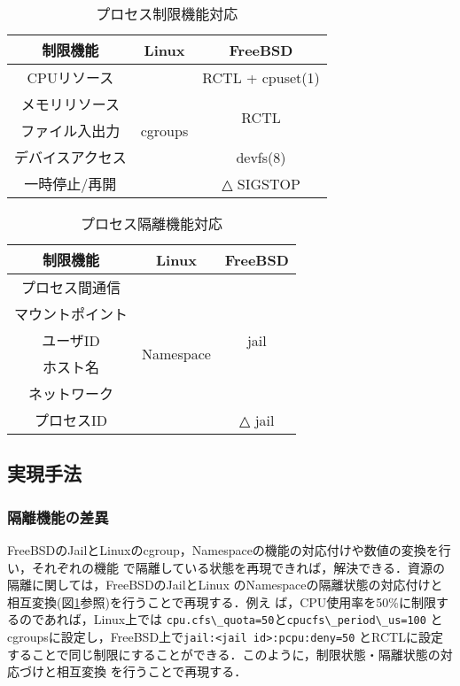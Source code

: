 \documentclass[11pt]{jarticle}
\begin{document}
\begin{table}
  \caption{プロセス制限機能対応}
  \label{tb:limit}
  \begin{center}
  \begin{tabular}{|c|c|c|} \hline
    制限機能 & Linux & FreeBSD \\ \hline \hline
    CPUリソース & \multirow{5}{*}{cgroups} &  RCTL + cpuset(1) \\ \cline{1-1} \cline{3-3}
    メモリリソース &  &  \multirow{2}{*}{RCTL} \\ \cline{1-1}
    ファイル入出力 &  &  \\ \cline{1-1} \cline{3-3}
    デバイスアクセス &  & devfs(8) \\ \cline{1-1} \cline{3-3}
    一時停止/再開 &  & △ SIGSTOP \\ \hline
  \end{tabular}
\end{center}
\end{table}

\begin{table}
  \caption{プロセス隔離機能対応}
  \label{tb:isolation}
  \begin{center}
  \begin{tabular}{|c|c|c|} \hline
    制限機能 & Linux & FreeBSD \\ \hline \hline
    プロセス間通信 & \multirow{6}{*}{Namespace} &  \multirow{5}{*}{jail} \\ \cline{1-1}
    マウントポイント &  & \\ \cline{1-1}
    ユーザID &  &  \\ \cline{1-1}
    ホスト名 &  & \\ \cline{1-1}
    ネットワーク &  & \\ \cline{1-1} \cline{3-3}
    プロセスID &  & △ jail \\ \hline
  \end{tabular}
\end{center}
\end{table}

\subsection{実現手法}
\subsubsection{隔離機能の差異}
FreeBSDのJailとLinuxのcgroup，Namespaceの機能の対応付けや数値の変換を行い，それぞれの機能
で隔離している状態を再現できれば，解決できる．資源の隔離に関しては，FreeBSDのJailとLinux
のNamespaceの隔離状態の対応付けと相互変換(図\ref{tb:limit}参照)を行うことで再現する．例え
ば，CPU使用率を50\%に制限するのであれば，Linux上では
\verb|cpu.cfs\_quota=50|と\verb|cpucfs\_period\_us=100|
とcgroupsに設定し，FreeBSD上で\verb|jail:<jail id>:pcpu:deny=50|
とRCTLに設定することで同じ制限にすることができる．このように，制限状態・隔離状態の対応づけと相互変換
を行うことで再現する．
\end{document}
